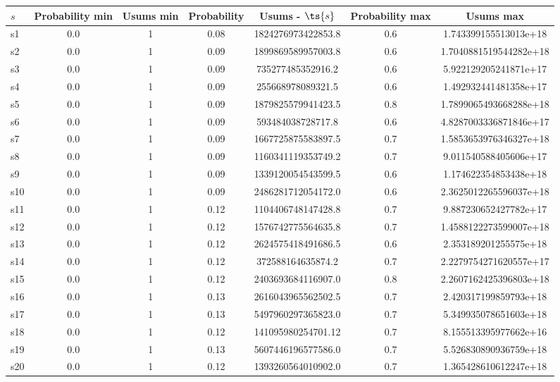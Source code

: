 \documentclass{article}
\begin{document}
\noindent\begin{tabular}{|l|c|c|c|c|c|c|}
\hline
$s$& Probability min & Usums min & Probability & Usums - $\ts{s}$ & Probability max & Usums max\\
\hline
s1 &0.0 & 1 & 0.08 & 1824276973422853.8 & 0.6 & 1.743399155513013e+18\\
\hline
s2 &0.0 & 1 & 0.09 & 1899869589957003.8 & 0.6 & 1.7040881519544282e+18\\
\hline
s3 &0.0 & 1 & 0.09 & 735277485352916.2 & 0.6 & 5.922129205241871e+17\\
\hline
s4 &0.0 & 1 & 0.09 & 255668978089321.5 & 0.6 & 1.492932441481358e+17\\
\hline
s5 &0.0 & 1 & 0.09 & 1879825579941423.5 & 0.8 & 1.7899065493668288e+18\\
\hline
s6 &0.0 & 1 & 0.09 & 593484038728717.8 & 0.6 & 4.8287003336871846e+17\\
\hline
s7 &0.0 & 1 & 0.09 & 1667725875583897.5 & 0.7 & 1.5853653976346327e+18\\
\hline
s8 &0.0 & 1 & 0.09 & 1160341119353749.2 & 0.7 & 9.011540588405606e+17\\
\hline
s9 &0.0 & 1 & 0.09 & 1339120054543599.5 & 0.6 & 1.174622354853438e+18\\
\hline
s10 &0.0 & 1 & 0.09 & 2486281712054172.0 & 0.6 & 2.3625012265596037e+18\\
\hline
s11 &0.0 & 1 & 0.12 & 1104406748147428.8 & 0.7 & 9.887230652427782e+17\\
\hline
s12 &0.0 & 1 & 0.12 & 1576742775564635.8 & 0.7 & 1.4588122273599007e+18\\
\hline
s13 &0.0 & 1 & 0.12 & 2624575418491686.5 & 0.6 & 2.353189201255575e+18\\
\hline
s14 &0.0 & 1 & 0.12 & 372588164635874.2 & 0.7 & 2.2279754271620557e+17\\
\hline
s15 &0.0 & 1 & 0.12 & 2403693684116907.0 & 0.8 & 2.2607162425396803e+18\\
\hline
s16 &0.0 & 1 & 0.13 & 2616043965562502.5 & 0.7 & 2.420317199859793e+18\\
\hline
s17 &0.0 & 1 & 0.13 & 5497960297365823.0 & 0.7 & 5.349935078651603e+18\\
\hline
s18 &0.0 & 1 & 0.12 & 141095980254701.12 & 0.7 & 8.155513395977662e+16\\
\hline
s19 &0.0 & 1 & 0.13 & 5607446196577586.0 & 0.7 & 5.526830890936759e+18\\
\hline
s20 &0.0 & 1 & 0.12 & 1393260564010902.0 & 0.7 & 1.365428610612247e+18\\

\end{tabular}
\end{document}
